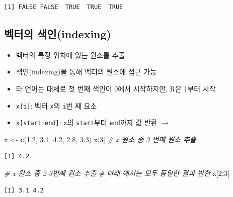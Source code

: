 \documentclass[
  11pt,
]{krantz}
\newenvironment{Shaded}{\begin{snugshade}}{\end{snugshade}}
\newcommand{\CommentTok}[1]{\textcolor[rgb]{0.37,0.37,0.37}{\textit{#1}}}
\newcommand{\DecValTok}[1]{\textcolor[rgb]{0.06,0.06,0.06}{#1}}
\newcommand{\FloatTok}[1]{\textcolor[rgb]{0.06,0.06,0.06}{#1}}
\newcommand{\KeywordTok}[1]{\textcolor[rgb]{0.27,0.27,0.27}{\textbf{#1}}}
\newcommand{\NormalTok}[1]{#1}
\newcommand{\OperatorTok}[1]{\textcolor[rgb]{0.43,0.43,0.43}{\textbf{#1}}}
\newcommand{\StringTok}[1]{\textcolor[rgb]{0.5,0.5,0.5}{#1}}
\providecommand{\tightlist}{%
  \setlength{\itemsep}{0pt}\setlength{\parskip}{0pt}}
\begin{document}
\begin{verbatim}
[1] FALSE FALSE  TRUE  TRUE  TRUE
\end{verbatim}

\normalsize

\hypertarget{vector-index}{%
\subsection{벡터의 색인(indexing)}\label{vector-index}}

\begin{itemize}
\tightlist
\item
  벡터의 특정 위치에 있는 원소를 추출\\
\item
  색인(indexing)을 통해 벡터의 원소에 접근 가능
\item
  타 언어는 대체로 첫 번째 색인이 0에서 시작하지만, R은 1부터 시작
\item
  \texttt{x{[}i{]}}: 벡터 \texttt{x}의 \texttt{i}번 째 요소
\item
  \texttt{x{[}start:end{]}}: \texttt{x}의 \texttt{start}부터 \texttt{end}까지 값 반환 \(\rightarrow\)
\end{itemize}

\footnotesize

\begin{Shaded}
\begin{Highlighting}[]
\NormalTok{x <-}\StringTok{ }\KeywordTok{c}\NormalTok{(}\FloatTok{1.2}\NormalTok{, }\FloatTok{3.1}\NormalTok{, }\FloatTok{4.2}\NormalTok{, }\FloatTok{2.8}\NormalTok{, }\FloatTok{3.3}\NormalTok{)}
\NormalTok{x[}\DecValTok{3}\NormalTok{] }\CommentTok{# x 원소 중 3 번째 원소 추출}
\end{Highlighting}
\end{Shaded}

\begin{verbatim}
[1] 4.2
\end{verbatim}

\begin{Shaded}
\begin{Highlighting}[]
\CommentTok{# x 원소 중 2-3번째 원소 추출}
\CommentTok{# 아래 예시는 모두 동일한 결과 반환}
\NormalTok{x[}\DecValTok{2}\OperatorTok{:}\DecValTok{3}\NormalTok{]}
\end{Highlighting}
\end{Shaded}

\begin{verbatim}
[1] 3.1 4.2
\end{verbatim}
\end{document}
